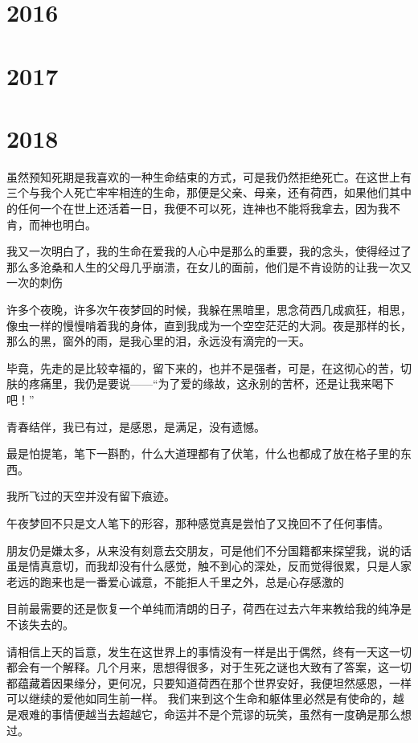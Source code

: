 \documentclass[UTF8,a4paper,8pt]{ctexbook}
\begin{document}
	\section{2016}
		
	
	\section{2017}
	
	
	
	\section{2018}
		
		虽然预知死期是我喜欢的一种生命结束的方式，可是我仍然拒绝死亡。在这世上有三个与我个人死亡牢牢相连的生命，那便是父亲、母亲，还有荷西，如果他们其中的任何一个在世上还活着一日，我便不可以死，连神也不能将我拿去，因为我不肯，而神也明白。
		
		我又一次明白了，我的生命在爱我的人心中是那么的重要，我的念头，使得经过了那么多沧桑和人生的父母几乎崩溃，在女儿的面前，他们是不肯设防的让我一次又一次的刺伤
		
		许多个夜晚，许多次午夜梦回的时候，我躲在黑暗里，思念荷西几成疯狂，相思，像虫一样的慢慢啃着我的身体，直到我成为一个空空茫茫的大洞。夜是那样的长，那么的黑，窗外的雨，是我心里的泪，永远没有滴完的一天。
		
		毕竟，先走的是比较幸福的，留下来的，也并不是强者，可是，在这彻心的苦，切肤的疼痛里，我仍是要说——“为了爱的缘故，这永别的苦杯，还是让我来喝下吧！”
		
		青春结伴，我已有过，是感恩，是满足，没有遗憾。
		
		最是怕提笔，笔下一斟酌，什么大道理都有了伏笔，什么也都成了放在格子里的东西。
		
		我所飞过的天空并没有留下痕迹。 
	
		午夜梦回不只是文人笔下的形容，那种感觉真是尝怕了又挽回不了任何事情。
	
		朋友仍是嫌太多，从来没有刻意去交朋友，可是他们不分国籍都来探望我，说的话虽是情真意切，而我却没有什么感觉，触不到心的深处，反而觉得很累，只是人家老远的跑来也是一番爱心诚意，不能拒人千里之外，总是心存感激的
		
		目前最需要的还是恢复一个单纯而清朗的日子，荷西在过去六年来教给我的纯净是不该失去的。
		
		请相信上天的旨意，发生在这世界上的事情没有一样是出于偶然，终有一天这一切都会有一个解释。几个月来，思想得很多，对于生死之谜也大致有了答案，这一切都蕴藏着因果缘分，更何况，只要知道荷西在那个世界安好，我便坦然感恩，一样可以继续的爱他如同生前一样。 我们来到这个生命和躯体里必然是有使命的，越是艰难的事情便越当去超越它，命运并不是个荒谬的玩笑，虽然有一度确是那么想过。
		
\end{document}

